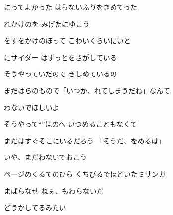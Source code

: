 \documentclass[14pt]{ltjsarticle}
\begin{document}
{\item
  にってよかった はらないふりをきめてった
  \jisho{}

  れかけのを みげたにゆこう
  \jisho{}

\item
  をすをかけのぼって こわいくらいにいと
  \jisho{}

  にサイダー はずっとをさがしている
  \jisho{}

\item
  そうやっていだので きしめているの
  \jisho{}

  まだはらのもので「いつか、れてしまうだね」なんて
  \jisho{}

  わないでほしいよ
  \jisho{}

\item
  そうやって``''はのへ いつめることもなくて
  \jisho{}

  まだはすぐそこにいるだろう 「そうだ、をめるは」
  \jisho{}

  いや、まだわないでおこう
  \jisho{}

\item
  ページめくるてのひら くちびるでほどいたミサンガ
  \jisho{}

  まばらなせ ねぇ、もわらないだ
  \jisho{}

\item
  どうかしてるみたい
  \jisho{}

  
}
\end{document}
